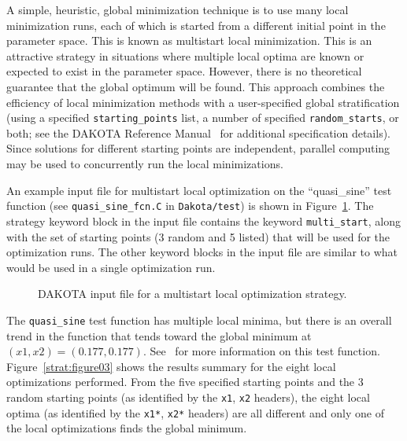A simple, heuristic, global minimization technique is to use many
local minimization runs, each of which is started from a different
initial point in the parameter space. This is known as multistart
local minimization. This is an attractive strategy in situations where
multiple local optima are known or expected to exist in the parameter
space. However, there is no theoretical guarantee that the global
optimum will be found. This approach combines the efficiency of local
minimization methods with a user-specified global stratification
(using a specified \texttt{starting\_points} list, a number of
specified \texttt{random\_starts}, or both; see the DAKOTA Reference
Manual~\cite{RefMan} for additional specification details). Since
solutions for different starting points are independent, parallel
computing may be used to concurrently run the local minimizations.

An example input file for multistart local optimization on the
``quasi\_sine'' test function (see \texttt{quasi\_sine\_fcn.C} in
\texttt{Dakota/test}) is shown in Figure~\ref{strat:figure02}. The
strategy keyword block in the input file contains the keyword
\texttt{multi\_start}, along with the set of starting points (3 random 
and 5 listed) that will be used for the optimization runs. The other
keyword blocks in the input file are similar to what would be used in
a single optimization run.

\begin{figure}
  \centering
  \begin{bigbox}
    \begin{small}
    \end{small}
  \end{bigbox}
  \caption{DAKOTA input file for a multistart local optimization strategy.}
  \label{strat:figure02}
\end{figure}

The \texttt{quasi\_sine} test function has multiple local minima, but
there is an overall trend in the function that tends toward the global
minimum at $(x1,x2)=(0.177,0.177)$. See~\cite{Giu00} for more
information on this test function. Figure~\ref{strat:figure03} shows
the results summary for the eight local optimizations performed. From
the five specified starting points and the 3 random starting points
(as identified by the \texttt{x1}, \texttt{x2} headers), the eight
local optima (as identified by the \texttt{x1*},
\texttt{x2*} headers) are all different and only one of the local
optimizations finds the global minimum.

